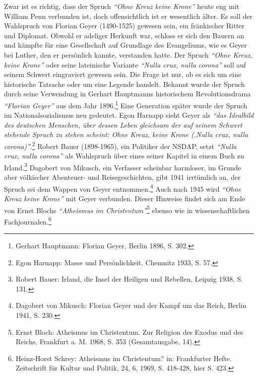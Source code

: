 Zwar ist es richtig, dass der Spruch \textit{"`Ohne Kreuz keine Krone"'} heute eng mit
William Penn verbunden ist, doch offensichtlich ist er wesentlich älter. Es soll
der Wahlspruch von Florian Geyer (1490-1525) gewesen sein, ein fränkischer
Ritter und Diplomat. Obwohl er adeliger Herkunft war, schloss er sich den Bauern
an und kämpfte für eine Gesellschaft auf Grundlage des Evangeliums, wie es Geyer
bei Luther, den er persönlich kannte, verstanden hatte. Der Spruch \textit{"`Ohne Kreuz,
keine Krone"'} oder seine lateinische Variante \textit{"`Nulla crux, nulla corona"'} soll
auf seinem Schwert eingraviert gewesen sein. Die Frage ist nur, ob es sich um
eine historische Tatsache oder um eine Legende handelt. Bekannt wurde der Spruch
durch seine Verwendung in Gerhart Hauptmanns historischem Revolutionsdrama
\textit{"`Florian Geyer"'} aus dem Jahr 1896.\footnote{Gerhart Hauptmann: Florian Geyer,
Berlin 1896, S. 302.} Eine Generation später wurde der Spruch im
Nationalsozialismus neu gedeutet. Egon Harnapp sieht Geyer als \textit{"`das Idealbild
des deutschen Menschen, über dessen Leben gleichsam der auf seinem Schwert
stehende Spruch zu stehen scheint: Ohne Kreuz, keine Krone (‚Nulla crux, nulla
corona)"'}.\footnote{Egon Harnapp: Masse und Persönlichkeit, Chemnitz 1933, S. 57.}
Robert Bauer (1898-1965), ein Politiker der NSDAP, setzt \textit{"`Nulla crux, nulla
corona"'} als Wahlspruch über eines seiner Kapitel in einem Buch zu Irland.\footnote{Robert Bauer:
Irland, die Insel der Heiligen und Rebellen, Leipzig 1938, S.
131.}
Dagobert von Mikusch, ein Verfasser scheinbar harmloser, im Grunde aber
völkischer Abenteuer- und Reisegeschichten, gibt 1941 irrtümlich an, der Spruch
sei dem Wappen von Geyer entnommen.\footnote{Dagobert von Mikusch: Florian Geyer
und der Kampf um das Reich, Berlin
1941, S. 230.} Auch nach 1945 wird \textit{"`Ohne Kreuz keine
Krone"'} mit Geyer verbunden. Dieser Hinweise findet sich am Ende von Ernst
Blochs \textit{"`Atheismus im Christentum"'}\footnote{Ernst Bloch: Atheismus im
Christentum. Zur Religion des Exodus und des
Reichs, Frankfurt a. M. 1968, S. 353 (Gesamtausgabe, 14).} ebenso wie in
wissenschaftlichen Fachjournalen.\footnote{Heinz-Horst Schrey: Atheismus im
Christentum? in: Frankfurter Hefte.
Zeitschrift für Kultur und Politik, 24, 6, 1969, S. 418-428, hier S. 423.}
